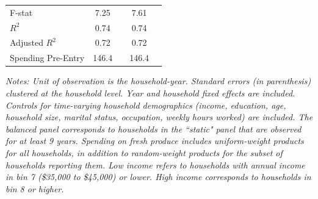 {{\begin{threeparttable}
\begin{tabular}{l*{2}{cc}}
F-stat          &     7.25         &         &     7.61         &         \\
\(R^{2}\)       &     0.74         &         &     0.74         &         \\
Adjusted \(R^{2}\)&     0.72         &         &     0.72         &         \\
Spending Pre-Entry&    146.4         &         &    146.4         &         \\
\hline\hline
\end{tabular}
\begin{tablenotes}[flushleft]
\small 
\item \textit{Notes: Unit of observation is the household-year. Standard errors (in parenthesis) clustered at the household level. Year and household fixed effects are included. Controls for time-varying household demographics (income, education, age, household size, marital status, occupation, weekly hours worked) are included. The balanced panel corresponds to households in the ``static" panel that are observed for at least 9 years. Spending on fresh produce includes uniform-weight products for all households, in addition to random-weight products for the subset of households reporting them. Low income refers to households with annual income in bin 7 (\$35,000 to \$45,000) or lower. High income corresponds to households in bin 8 or higher.}
\end{tablenotes}


\end{threeparttable}}
}
